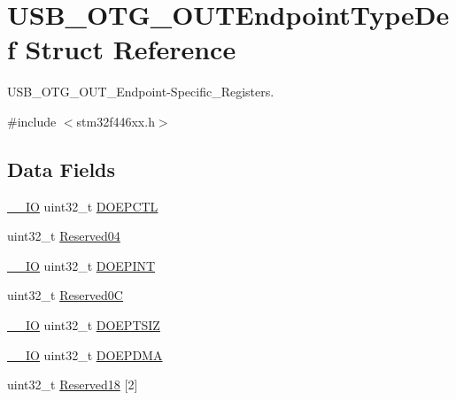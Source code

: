 \hypertarget{struct_u_s_b___o_t_g___o_u_t_endpoint_type_def}{}\section{U\+S\+B\+\_\+\+O\+T\+G\+\_\+\+O\+U\+T\+Endpoint\+Type\+Def Struct Reference}
\label{struct_u_s_b___o_t_g___o_u_t_endpoint_type_def}


U\+S\+B\+\_\+\+O\+T\+G\+\_\+\+O\+U\+T\+\_\+\+Endpoint-\/\+Specific\+\_\+\+Registers.  




{\ttfamily \#include $<$stm32f446xx.\+h$>$}

\subsection*{Data Fields}
\begin{DoxyCompactItemize}
\item 
\mbox{\hyperlink{core__sc300_8h_aec43007d9998a0a0e01faede4133d6be}{\+\_\+\+\_\+\+IO}} uint32\+\_\+t \mbox{\hyperlink{struct_u_s_b___o_t_g___o_u_t_endpoint_type_def_a905a2b4ece4882eb67c710e0db10e960}{D\+O\+E\+P\+C\+TL}}
\item 
uint32\+\_\+t \mbox{\hyperlink{struct_u_s_b___o_t_g___o_u_t_endpoint_type_def_acfe7efaa61db86840767dff6d73f8695}{Reserved04}}
\item 
\mbox{\hyperlink{core__sc300_8h_aec43007d9998a0a0e01faede4133d6be}{\+\_\+\+\_\+\+IO}} uint32\+\_\+t \mbox{\hyperlink{struct_u_s_b___o_t_g___o_u_t_endpoint_type_def_affd2c6f534c8f2c252f3a93d0cd04ea2}{D\+O\+E\+P\+I\+NT}}
\item 
uint32\+\_\+t \mbox{\hyperlink{struct_u_s_b___o_t_g___o_u_t_endpoint_type_def_a1bcc039378b4ed4ac1261a0a758c3d1d}{Reserved0C}}
\item 
\mbox{\hyperlink{core__sc300_8h_aec43007d9998a0a0e01faede4133d6be}{\+\_\+\+\_\+\+IO}} uint32\+\_\+t \mbox{\hyperlink{struct_u_s_b___o_t_g___o_u_t_endpoint_type_def_a35b668314acbac2580b98caf8b9c5c10}{D\+O\+E\+P\+T\+S\+IZ}}
\item 
\mbox{\hyperlink{core__sc300_8h_aec43007d9998a0a0e01faede4133d6be}{\+\_\+\+\_\+\+IO}} uint32\+\_\+t \mbox{\hyperlink{struct_u_s_b___o_t_g___o_u_t_endpoint_type_def_a78a4f036f29e552acad6a442fbb69420}{D\+O\+E\+P\+D\+MA}}
\item 
uint32\+\_\+t \mbox{\hyperlink{struct_u_s_b___o_t_g___o_u_t_endpoint_type_def_a78fbe0aab076cfbf9df51dd6f67eaf82}{Reserved18}} \mbox{[}2\mbox{]}
\end{DoxyCompactItemize}


